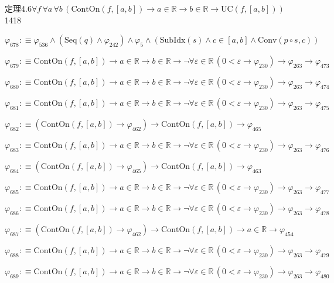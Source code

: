 \begin{fullproof}{定理4.6}{$\forall f\,\forall a\,\forall b\,(\mathrm{ContOn}(f,[a,b]) \to a \in \mathbb{R} \to b \in \mathbb{R} \to \mathrm{UC}(f,[a,b]))$}{1418}
\begin{abbrevlist}
\item $\varphi_{678} :\equiv \varphi_{536} \land (\mathrm{Seq}(q) \land \varphi_{242}) \land \varphi_{5} \land (\mathrm{SubIdx}(s) \land c \in [a,b] \land \mathrm{Conv}(p \circ s,c))$
\item $\varphi_{679} :\equiv \mathrm{ContOn}(f,[a,b]) \to a \in \mathbb{R} \to b \in \mathbb{R} \to \neg \forall \varepsilon \in \mathbb{R}\,(0 < \varepsilon \to \varphi_{230}) \to \varphi_{263} \to \varphi_{473}$
\item $\varphi_{680} :\equiv \mathrm{ContOn}(f,[a,b]) \to a \in \mathbb{R} \to b \in \mathbb{R} \to \neg \forall \varepsilon \in \mathbb{R}\,(0 < \varepsilon \to \varphi_{230}) \to \varphi_{263} \to \varphi_{474}$
\item $\varphi_{681} :\equiv \mathrm{ContOn}(f,[a,b]) \to a \in \mathbb{R} \to b \in \mathbb{R} \to \neg \forall \varepsilon \in \mathbb{R}\,(0 < \varepsilon \to \varphi_{230}) \to \varphi_{263} \to \varphi_{475}$
\item $\varphi_{682} :\equiv (\mathrm{ContOn}(f,[a,b]) \to \varphi_{462}) \to \mathrm{ContOn}(f,[a,b]) \to \varphi_{465}$
\item $\varphi_{683} :\equiv \mathrm{ContOn}(f,[a,b]) \to a \in \mathbb{R} \to b \in \mathbb{R} \to \neg \forall \varepsilon \in \mathbb{R}\,(0 < \varepsilon \to \varphi_{230}) \to \varphi_{263} \to \varphi_{476}$
\item $\varphi_{684} :\equiv (\mathrm{ContOn}(f,[a,b]) \to \varphi_{465}) \to \mathrm{ContOn}(f,[a,b]) \to \varphi_{463}$
\item $\varphi_{685} :\equiv \mathrm{ContOn}(f,[a,b]) \to a \in \mathbb{R} \to b \in \mathbb{R} \to \neg \forall \varepsilon \in \mathbb{R}\,(0 < \varepsilon \to \varphi_{230}) \to \varphi_{263} \to \varphi_{477}$
\item $\varphi_{686} :\equiv \mathrm{ContOn}(f,[a,b]) \to a \in \mathbb{R} \to b \in \mathbb{R} \to \neg \forall \varepsilon \in \mathbb{R}\,(0 < \varepsilon \to \varphi_{230}) \to \varphi_{263} \to \varphi_{478}$
\item $\varphi_{687} :\equiv (\mathrm{ContOn}(f,[a,b]) \to \varphi_{462}) \to \mathrm{ContOn}(f,[a,b]) \to a \in \mathbb{R} \to \varphi_{454}$
\item $\varphi_{688} :\equiv \mathrm{ContOn}(f,[a,b]) \to a \in \mathbb{R} \to b \in \mathbb{R} \to \neg \forall \varepsilon \in \mathbb{R}\,(0 < \varepsilon \to \varphi_{230}) \to \varphi_{263} \to \varphi_{479}$
\item $\varphi_{689} :\equiv \mathrm{ContOn}(f,[a,b]) \to a \in \mathbb{R} \to b \in \mathbb{R} \to \neg \forall \varepsilon \in \mathbb{R}\,(0 < \varepsilon \to \varphi_{230}) \to \varphi_{263} \to \varphi_{480}$

\end{abbrevlist}
\end{fullproof}
